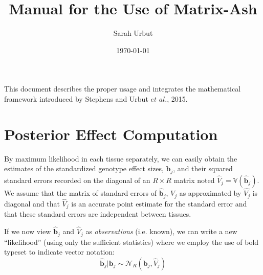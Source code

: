 \documentclass[10pt]{article}
\newcommand{\etal}{\textit{et al.}} %
\newcommand{\Var}{\mathbb{V}} %
\newcommand{\Norm}{{\mathcal{N}}} %
\begin{document}
\title{Manual for the Use of Matrix-Ash}
\author{Sarah Urbut}
\date{\today}

\maketitle

\tableofcontents

\vspace{1cm}

This document describes the proper usage and integrates the mathematical framework introduced by Stephens and Urbut $\etal$, 2015.



\section{Posterior Effect Computation} 



By maximum likelihood in each tissue separately, we can easily obtain the estimates of the standardized genotype effect sizes, $\hat{\bm{b}}_{j}$, and their squared standard errors recorded on the diagonal of an $R \times R$ matrix noted $\hat{V}_{j} = \Var(\hat{\bm{b}}_{j})$. We assume that the matrix of standard errors of $\hat{\bm{b}}_{j}$, $V_{j}$ as approximated by $\hat{V_{j}}$ is diagonal and  that $\hat{V}_{j}$ is an accurate point estimate for the standard error and that these standard errors are independent between tissues.

If we now view $\hat{\bm{b}}_{j}$ and $\hat{V}_{j}$ as \emph{observations} (i.e. known), we can write a new ``likelihood'' (using only the sufficient statistics) where we employ the use of bold typeset to indicate vector notation:
\begin{equation}
  \label{new_lik}
  \hat{\bm{b}}_{j} | \bm{b}_{j} \sim \Norm_R(\bm{b}_{j}, \hat{V}_{j})
\end{equation}



%
%
%
\end{document}
